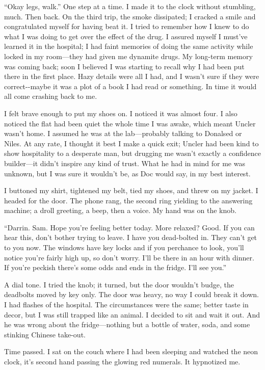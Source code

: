 ``Okay legs, walk.'' One step at a time. I made it to the clock without
stumbling, much. Then back. On the third trip, the smoke dissipated; I
cracked a smile and congratulated myself for having beat it. I tried to
remember how I knew to do what I was doing to get over the effect of the
drug. I assured myself I must've learned it in the hospital; I had faint
memories of doing the same activity while locked in my room---they had
given me dynamite drugs. My long-term memory was coming back; soon I
believed I was starting to recall why I had been put there in the first
place. Hazy details were all I had, and I wasn't sure if they were
correct-\/-maybe it was a plot of a book I had read or something. In
time it would all come crashing back to me.

I felt brave enough to put my shoes on. I noticed it was almost four. I
also noticed the flat had been quiet the whole time I was awake, which
meant Uncler wasn't home. I assumed he was at the lab---probably talking
to Donalsed or Niles. At any rate, I thought it best I make a quick
exit; Uncler had been kind to show hospitality to a desperate man, but
drugging me wasn't exactly a confidence builder---it didn't inspire any
kind of trust. What he had in mind for me was unknown, but I was sure it
wouldn't be, as Doc would say, in my best interest.

I buttoned my shirt, tightened my belt, tied my shoes, and threw on my
jacket. I headed for the door. The phone rang, the second ring yielding
to the answering machine; a droll greeting, a beep, then a voice. My
hand was on the knob.

``Darrin. Sam. Hope you're feeling better today. More relaxed? Good. If
you can hear this, don't bother trying to leave. I have you dead-bolted
in. They can't get to you now. The windows have key locks and if you
perchance to look, you'll notice you're fairly high up, so don't worry.
I'll be there in an hour with dinner. If you're peckish there's some
odds and ends in the fridge. I'll see you.''

A dial tone. I tried the knob; it turned, but the door wouldn't budge,
the deadbolts moved by key only. The door was heavy, no way I could
break it down. I had flashes of the hospital. The circumstances were the
same; better taste in decor, but I was still trapped like an animal. I
decided to sit and wait it out. And he was wrong about the
fridge---nothing but a bottle of water, soda, and some stinking Chinese
take-out.

Time passed. I sat on the couch where I had been sleeping and watched
the neon clock, it's second hand passing the glowing red numerals. It
hypnotized me.


